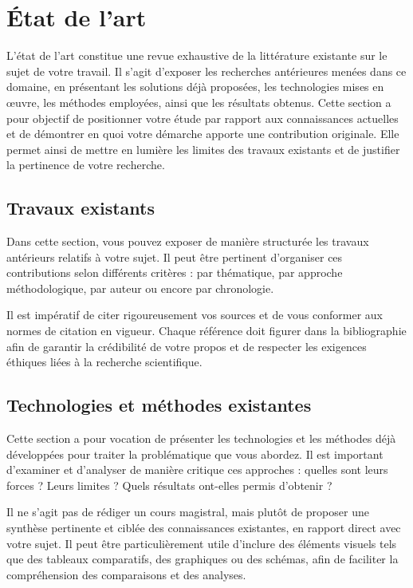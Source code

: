 \chapter{État de l'art}

L'état de l'art constitue une revue exhaustive de la littérature existante sur le sujet de votre travail. Il s'agit d'exposer les recherches antérieures menées dans ce domaine, en présentant les solutions déjà proposées, les technologies mises en œuvre, les méthodes employées, ainsi que les résultats obtenus. Cette section a pour objectif de positionner votre étude par rapport aux connaissances actuelles et de démontrer en quoi votre démarche apporte une contribution originale. Elle permet ainsi de mettre en lumière les limites des travaux existants et de justifier la pertinence de votre recherche.

\section{Travaux existants}

Dans cette section, vous pouvez exposer de manière structurée les travaux antérieurs relatifs à votre sujet. Il peut être pertinent d'organiser ces contributions selon différents critères : par thématique, par approche méthodologique, par auteur ou encore par chronologie.

Il est impératif de citer rigoureusement vos sources et de vous conformer aux normes de citation en vigueur. Chaque référence doit figurer dans la bibliographie afin de garantir la crédibilité de votre propos et de respecter les exigences éthiques liées à la recherche scientifique.

\section{Technologies et méthodes existantes}

Cette section a pour vocation de présenter les technologies et les méthodes déjà développées pour traiter la problématique que vous abordez. Il est important d'examiner et d'analyser de manière critique ces approches : quelles sont leurs forces ? Leurs limites ? Quels résultats ont-elles permis d'obtenir ?

Il ne s'agit pas de rédiger un cours magistral, mais plutôt de proposer une synthèse pertinente et ciblée des connaissances existantes, en rapport direct avec votre sujet. Il peut être particulièrement utile d'inclure des éléments visuels tels que des tableaux comparatifs, des graphiques ou des schémas, afin de faciliter la compréhension des comparaisons et des analyses.

